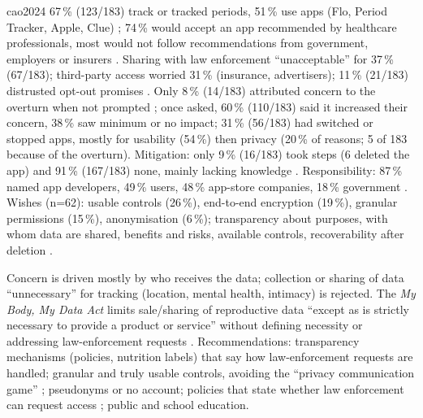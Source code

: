 \begin{papercard}{cao2024}
 67\,\% (123/183) track or tracked periods, 51\,\% use apps (Flo, Period Tracker, Apple, Clue) ; 74\,\% would accept an app recommended by healthcare professionals, most would not follow recommendations from government, employers or insurers . Sharing with law enforcement ``unacceptable'' for 37\,\% (67/183); third-party access worried 31\,\% (insurance, advertisers); 11\,\% (21/183) distrusted opt-out promises . Only 8\,\% (14/183) attributed concern to the overturn when not prompted ; once asked, 60\,\% (110/183) said it increased their concern, 38\,\% saw minimum or no impact; 31\,\% (56/183) had switched or stopped apps, mostly for usability (54\,\%) then privacy (20\,\% of reasons; 5 of 183 because of the overturn). Mitigation: only 9\,\% (16/183) took steps (6 deleted the app) and 91\,\% (167/183) none, mainly lacking knowledge . Responsibility: 87\,\% named app developers, 49\,\% users, 48\,\% app-store companies, 18\,\% government . Wishes (n=62): usable controls (26\,\%), end-to-end encryption (19\,\%), granular permissions (15\,\%), anonymisation (6\,\%); transparency about purposes, with whom data are shared, benefits and risks, available controls, recoverability after deletion .

 Concern is driven mostly by who receives the data; collection or sharing of data ``unnecessary'' for tracking (location, mental health, intimacy) is rejected. The \emph{My Body, My Data Act} limits sale/sharing of reproductive data ``except as is strictly necessary to provide a product or service'' without defining necessity or addressing law-enforcement requests . Recommendations: transparency mechanisms (policies, nutrition labels) that say how law-enforcement requests are handled; granular and truly usable controls, avoiding the ``privacy communication game'' ; pseudonyms or no account; policies that state whether law enforcement can request access ; public and school education.


\end{papercard}
